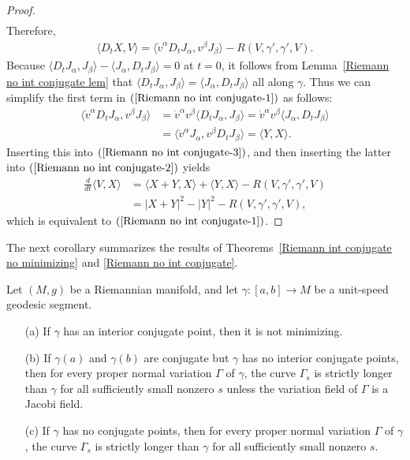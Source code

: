 \begin{proof}
\begin{align*}
\end{align*}
Therefore,
\begin{align}\label{Riemann no int conjugate-3}
\langle D_tX,V\rangle=\langle\dot{v}^\alpha D_tJ_\alpha,v^\beta J_\beta\rangle-R(V,\gamma',\gamma',V).
\end{align}
Because $\langle D_tJ_\alpha,J_\beta\rangle-\langle J_\alpha,D_tJ_\beta\rangle=0$ at $t=0$, it follows from Lemma~\ref{Riemann no int conjugate lem} that 
$\langle D_tJ_\alpha,J_\beta\rangle=\langle J_\alpha,D_tJ_\beta\rangle$ all along $\gamma$. Thus we can simplify the first term in $(\ref{Riemann no int conjugate-1})$ 
as follows:
\begin{align*}
\langle\dot{v}^\alpha D_tJ_\alpha,v^\beta J_\beta\rangle&=\dot{v}^\alpha v^\beta\langle D_tJ_\alpha, J_\beta\rangle=\dot{v}^\alpha v^\beta\langle J_\alpha, D_tJ_\beta\rangle\\
&=\langle\dot{v}^\alpha J_\alpha,v^\beta D_tJ_\beta\rangle=\langle Y,X\rangle.
\end{align*}
Inserting this into $(\ref{Riemann no int conjugate-3})$, and then inserting the latter into $(\ref{Riemann no int conjugate-2})$ yields
\begin{align*}
\frac{d}{dt}\langle V,X\rangle&=\langle X+Y,X\rangle+\langle Y,X\rangle-R(V,\gamma',\gamma',V)\\
&=|X+Y|^2-|Y|^2-R(V,\gamma',\gamma',V),
\end{align*}
which is equivalent to $(\ref{Riemann no int conjugate-1})$.
\end{proof}
The next corollary summarizes the results of Theorems~\ref{Riemann int conjugate no minimizing} and \ref{Riemann no int conjugate}.
\begin{corollary}
Let $(M,g)$ be a Riemannian manifold, and let $\gamma:[a,b]\to M$ be a unit-speed geodesic segment.
\begin{itemize}
\item[(a)] If $\gamma$ has an interior conjugate point, then it is not minimizing.
\item[(b)] If $\gamma(a)$ and $\gamma(b)$ are conjugate but $\gamma$ has no interior conjugate points, then for every proper normal variation $\Gamma$ of $\gamma$, 
the curve $\Gamma_s$ is strictly longer than $\gamma$ for all sufficiently small nonzero $s$ unless the variation field of $\Gamma$ is a Jacobi field.
\item[(c)] If $\gamma$ has no conjugate points, then for every proper normal variation $\Gamma$ of $\gamma$, the curve $\Gamma_s$ is strictly longer than $\gamma$ for 
all sufficiently small nonzero $s$.
\end{itemize}
\end{corollary}
